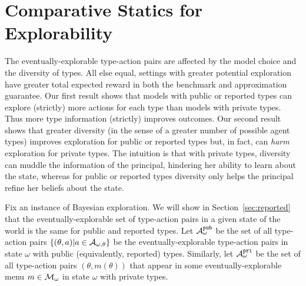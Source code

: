 
\section{Comparative Statics for Explorability}
\label{sec:statics}

\newcommand{\pairs}{\AExp_{\omega}}
\newcommand{\pairsPub}{\pairs^{\term{pub}}}
\newcommand{\pairsPri}{\pairs^{\term{pri}}}

\newcommand{\support}{\term{support}}

The eventually-explorable type-action pairs are affected by the model choice and the diversity of types.  All else equal, settings with greater potential exploration have greater total expected reward in both the benchmark and approximation guarantee.  
%
Our first result shows that models with public or reported types can explore (strictly) more actions for each type than models with private types.  Thus more type information (strictly) improves outcomes.
%
Our second result shows that greater diversity (in the sense of a greater number of possible agent types) improves exploration for public or reported types but, in fact, can {\em harm} exploration for private types.  The intuition is that with private types, diversity can muddle the information of the principal, hindering her ability to learn about the state, whereas for public or reported types diversity only helps the principal refine her beliefs about the state. 

Fix an instance of Bayesian exploration. We will show in Section~\ref{sec:reported} that the eventually-explorable set of type-action pairs in a given state of the world is the same for public and reported types. Let $\pairsPub$ be the set of all type-action pairs $\{(\theta,a)|a\in\mathcal{A}_{\omega,\theta}\}$ be the eventually-explorable type-action pairs in state $\omega$ with public (equivalently, reported) types.  Similarly, let $\pairsPri$ be the set of all type-action pairs $(\theta,m(\theta))$ that appear in some eventually-explorable menu $m\in \mathcal{M}_{\omega}$ in state $\omega$ with private types.

